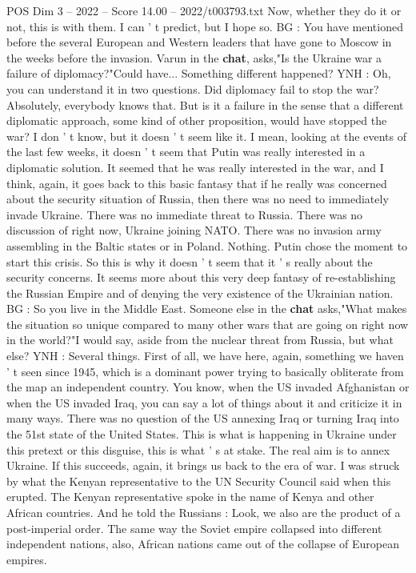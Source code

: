 \begin{textsample}{POS Dim 3 – 2022 – Score 14.00 – 2022/t003793.txt}
Now, whether they do it or not, this is with them.
I can ' t predict, but I hope so.
BG : You have mentioned before the several European and Western leaders that have gone to Moscow in the weeks before the invasion.
Varun in the \textbf{chat}, asks,"Is the Ukraine war a failure of diplomacy?"Could have...
Something different happened?
YNH : Oh, you can understand it in two questions.
Did diplomacy fail to stop the war?
Absolutely, everybody knows that.
But is it a failure in the sense that a different diplomatic approach, some kind of other proposition, would have stopped the war?
I don ' t know, but it doesn ' t seem like it.
I mean, looking at the events of the last few weeks, it doesn ' t seem that Putin was really interested in a diplomatic solution.
It seemed that he was really interested in the war, and I think, again, it goes back to this basic fantasy that if he really was concerned about the security situation of Russia, then there was no need to immediately invade Ukraine.
There was no immediate threat to Russia.
There was no discussion of right now, Ukraine joining NATO.
There was no invasion army assembling in the Baltic states or in Poland.
Nothing.
Putin chose the moment to start this crisis.
So this is why it doesn ' t seem that it ' s really about the security concerns.
It seems more about this very deep fantasy of re-establishing the Russian Empire and of denying the very existence of the Ukrainian nation.
BG : So you live in the Middle East.
Someone else in the \textbf{chat} asks,"What makes the situation so unique compared to many other wars that are going on right now in the world?"I would say, aside from the nuclear threat from Russia, but what else?
YNH : Several things.
First of all, we have here, again, something we haven ' t seen since 1945, which is a dominant power trying to basically obliterate from the map an independent country.
You know, when the US invaded Afghanistan or when the US invaded Iraq, you can say a lot of things about it and criticize it in many ways.
There was no question of the US annexing Iraq or turning Iraq into the 51st state of the United States.
This is what is happening in Ukraine under this pretext or this disguise, this is what ' s at stake.
The real aim is to annex Ukraine.
If this succeeds, again, it brings us back to the era of war.
I was struck by what the Kenyan representative to the UN Security Council said when this erupted.
The Kenyan representative spoke in the name of Kenya and other African countries.
And he told the Russians : Look, we also are the product of a post-imperial order.
The same way the Soviet empire collapsed into different independent nations, also, African nations came out of the collapse of European empires.

\end{textsample}
